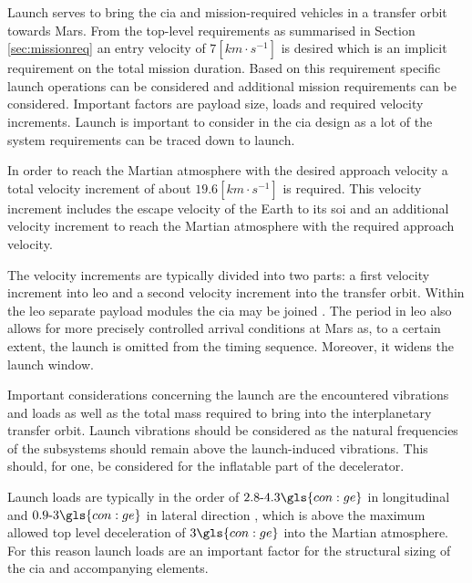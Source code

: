 Launch serves to bring the \gls{cia} and mission-required vehicles in a transfer orbit towards Mars. From the top-level requirements as summarised in Section \ref{sec:missionreq} an entry velocity of $7 [km\cdot s^{-1}]$ is desired which is an implicit requirement on the total mission duration.
Based on this requirement specific launch operations can be considered and additional mission requirements can be considered. Important factors are payload size, loads and required velocity increments. Launch is important to consider in the \gls{cia} design as a lot of the system requirements can be traced down to launch.

In order to reach the Martian atmosphere with the desired approach velocity a total velocity increment of about $19.6 [km\cdot s^{-1}]$ is required. This velocity increment includes the escape velocity of the Earth to its \gls{soi} and an additional velocity increment to reach the Martian atmosphere with the required approach velocity.

The velocity increments are typically divided into two parts: a first velocity increment into \gls{leo} and a second velocity increment into the transfer orbit. Within the \gls{leo} separate payload modules the \gls{cia} may be joined \cite{George2009}. The period in \gls{leo} also allows for more precisely controlled arrival conditions at Mars as, to a certain extent, the launch is omitted from the timing sequence. Moreover, it widens the launch window.


Important considerations concerning the launch are the encountered vibrations and loads as well as the total mass required to bring into the interplanetary transfer orbit. Launch vibrations should be considered as the natural frequencies of the subsystems should remain above the launch-induced vibrations. This should, for one, be considered for the inflatable part of the decelerator.

Launch loads are typically in the order of $2.8\mbox{-}4.3 \gls{con:ge}$ in longitudinal and $0.9\mbox{-}3 \gls{con:ge}$ in lateral direction \cite{Wertz2011}, which is above the maximum allowed top level deceleration of $3\gls{con:ge}$ into the Martian atmosphere. For this reason launch loads are an important factor for the structural sizing of the \gls{cia} and accompanying elements. 

